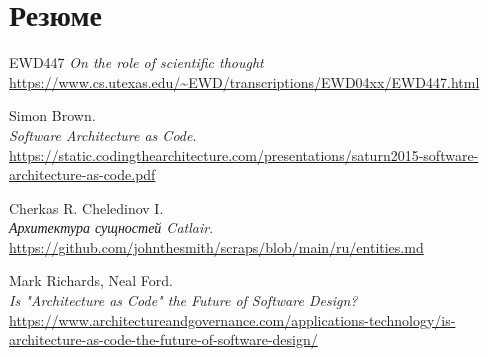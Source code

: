 \documentclass[final]{article}
\begin{document}
    \section{Резюме}

    \renewcommand{\refname}{Список литературы}
    \begin{thebibliography}{9}

         EWD447
        \textit{On the role of scientific thought}
        \url{https://www.cs.utexas.edu/~EWD/transcriptions/EWD04xx/EWD447.html}

        Simon Brown.\\
        \textit{Software Architecture as Code}.\\
        \url{https://static.codingthearchitecture.com/presentations/saturn2015-software-architecture-as-code.pdf}

        Cherkas R. Cheledinov I.\\
        \textit{Архитектура сущностей Catlair}.\\
        \url{https://github.com/johnthesmith/scraps/blob/main/ru/entities.md}

        Mark Richards, Neal Ford.\\
        \textit{Is "Architecture as Code" the Future of Software Design?}\\
        \url{https://www.architectureandgovernance.com/applications-technology/is-architecture-as-code-the-future-of-software-design/}

    \end{thebibliography}
\end{document}
